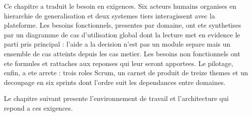Ce chapitre a traduit le besoin en exigences. Six acteurs humains
organises en hierarchie de generalisation et deux systemes tiers
interagissent avec la plateforme. Les besoins fonctionnels, presentes par
domaine, ont ete synthetises par un diagramme de cas d'utilisation global
dont la lecture met en evidence le parti pris principal : l'aide a la
decision n'est pas un module separe mais un ensemble de cas atteints
depuis les cas metier. Les besoins non fonctionnels ont ete formules et
rattaches aux reponses qui leur seront apportees. Le pilotage, enfin, a
ete arrete : trois roles Scrum, un carnet de produit de treize themes et
un decoupage en six sprints dont l'ordre suit les dependances entre
domaines.

Le chapitre suivant presente l'environnement de travail et l'architecture
qui repond a ces exigences.
